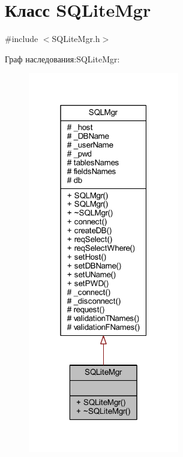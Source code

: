 \hypertarget{class_s_q_lite_mgr}{}\section{Класс S\+Q\+Lite\+Mgr}
\label{class_s_q_lite_mgr}


{\ttfamily \#include $<$S\+Q\+Lite\+Mgr.\+h$>$}



Граф наследования\+:S\+Q\+Lite\+Mgr\+:\nopagebreak
\begin{figure}[H]
\begin{center}
\leavevmode
\includegraphics[width=187pt]{d6/d3a/class_s_q_lite_mgr__inherit__graph}
\end{center}
\end{figure}


